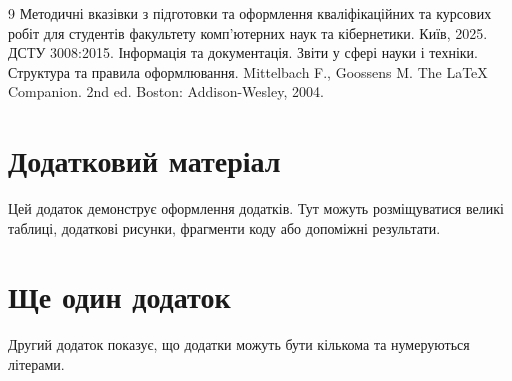 ﻿\documentclass[14pt]{extarticle}
\begin{document}
\begin{thebibliography}{9}
 Методичні вказівки з підготовки та оформлення кваліфікаційних та курсових робіт для студентів факультету комп'ютерних наук та кібернетики. Київ, 2025.
 ДСТУ 3008:2015. Інформація та документація. Звіти у сфері науки і техніки. Структура та правила оформлювання.
 Mittelbach F., Goossens M. The \LaTeX{} Companion. 2nd ed. Boston: Addison-Wesley, 2004.
\end{thebibliography}

\appendix
\section{Додатковий матеріал}
\label{app:extra}
Цей додаток демонструє оформлення додатків. Тут можуть розміщуватися великі таблиці, додаткові рисунки, фрагменти коду або допоміжні результати.

\section{Ще один додаток}
Другий додаток показує, що додатки можуть бути кількома та нумеруються літерами.
\end{document}

